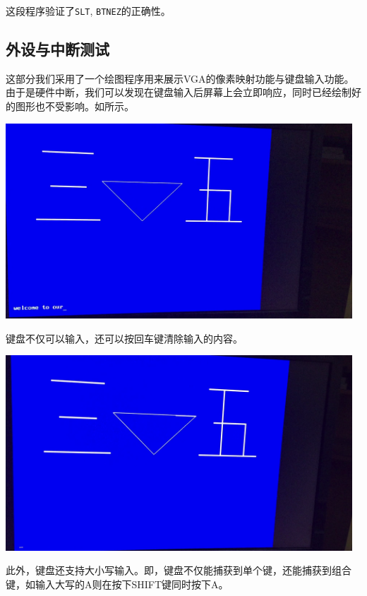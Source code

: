 这段程序验证了\texttt{SLT}, \texttt{BTNEZ}的正确性。

\subsection{外设与中断测试}

这部分我们采用了一个绘图程序用来展示VGA的像素映射功能与键盘输入功能。由于是硬件中断，我们可以发现在键盘输入后屏幕上会立即响应，同时已经绘制好的图形也不受影响。如所示。

\begin{center}
    \includegraphics[width=13cm]{image/testing/vga_keyboard}
    \label{fig:vga_keyboard}
\end{center}

键盘不仅可以输入，还可以按回车键清除输入的内容。

\begin{center}
    \includegraphics[width=13cm]{image/testing/clear}
\end{center}

此外，键盘还支持大小写输入。即，键盘不仅能捕获到单个键，还能捕获到组合键，如输入大写的A则在按下SHIFT键同时按下A。

